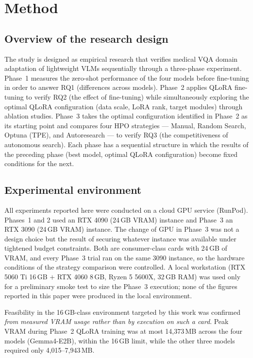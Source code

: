 \section{Method}
\label{sec:method}

\subsection{Overview of the research design}
\label{sec:design}

The study is designed as empirical research that verifies medical VQA domain
adaptation of lightweight VLMs sequentially through a three-phase experiment.
Phase~1 measures the zero-shot performance of the four models before fine-tuning
in order to answer RQ1 (differences across models). Phase~2 applies QLoRA
fine-tuning to verify RQ2 (the effect of fine-tuning) while simultaneously
exploring the optimal QLoRA configuration (data scale, LoRA rank, target modules)
through ablation studies. Phase~3 takes the optimal configuration identified in
Phase~2 as its starting point and compares four HPO strategies --- Manual, Random
Search, Optuna (TPE), and Autoresearch --- to verify RQ3 (the competitiveness of
autonomous search). Each phase has a sequential structure in which the results of
the preceding phase (best model, optimal QLoRA configuration) become fixed
conditions for the next.

\subsection{Experimental environment}
\label{sec:hardware}

All experiments reported here were conducted on a cloud GPU service (RunPod).
Phases~1 and 2 used an RTX 4090 (24\,GB VRAM) instance and Phase~3 an RTX 3090
(24\,GB VRAM) instance. The change of GPU in Phase~3 was not a design choice but
the result of securing whatever instance was available under tightened budget
constraints. Both are consumer-class cards with 24\,GB of VRAM, and every Phase~3
trial ran on the same 3090 instance, so the hardware conditions of the strategy
comparison were controlled. A local workstation (RTX 5060 Ti 16\,GB $+$ RTX 4060
8\,GB, Ryzen 5 5600X, 32\,GB RAM) was used only for a preliminary smoke test to
size the Phase~3 execution; none of the figures reported in this paper were
produced in the local environment.

Feasibility in the 16\,GB-class environment targeted by this work was confirmed
\emph{from measured VRAM usage rather than by execution on such a card}. Peak
VRAM during Phase~2 QLoRA training was at most 14,373\,MB across the four models
(Gemma4-E2B), within the 16\,GB limit, while the other three models required only
4,015--7,943\,MB.

